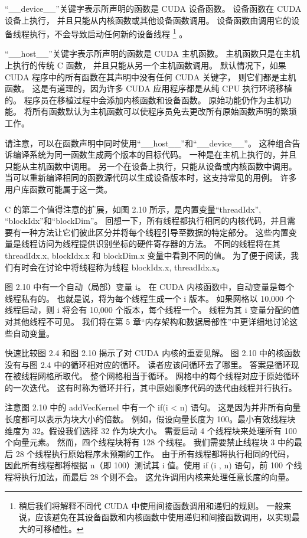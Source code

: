 “\_\_device\_\_”关键字表示所声明的函数是 CUDA 设备函数。 设备函数在 CUDA 设备上执行，
并且只能从内核函数或其他设备函数调用。 设备函数由调用它的设备线程执行，不会导致启动任何新的设备线程
\footnote{稍后我们将解释不同代 CUDA 中使用间接函数调用和递归的规则。 
一般来说，应该避免在其设备函数和内核函数中使用递归和间接函数调用，以实现最大的可移植性。} 。

“\_\_host\_\_”关键字表示所声明的函数是 CUDA 主机函数。 主机函数只是在主机上执行的传统 C 函数，
并且只能从另一个主机函数调用。 默认情况下，如果 CUDA 程序中的所有函数在其声明中没有任何 CUDA 关键字，
则它们都是主机函数。 这是有道理的，因为许多 CUDA 应用程序都是从纯 CPU 执行环境移植的。 
程序员在移植过程中会添加内核函数和设备函数。 原始功能仍作为主机功能。 
将所有函数默认为主机函数可以使程序员免去更改所有原始函数声明的繁琐工作。

请注意，可以在函数声明中同时使用“\_\_host\_\_”和“\_\_device\_\_”。 
这种组合告诉编译系统为同一函数生成两个版本的目标代码。 一种是在主机上执行的，并且只能从主机函数中调用。 
另一个在设备上执行，只能从设备或内核函数中调用。 当可以重新编译相同的函数源代码以生成设备版本时，这支持常见的用例。 
许多用户库函数可能属于这一类。

C 的第二个值得注意的扩展，如图 2.10 所示，是内置变量“threadIdx”, “blockIdx”和“blockDim”。 
回想一下，所有线程都执行相同的内核代码，并且需要有一种方法让它们彼此区分并将每个线程引导至数据的特定部分。 
这些内置变量是线程访问为线程提供识别坐标的硬件寄存器的方法。 
不同的线程将在其 threadIdx.x, blockIdx.x 和 blockDim.x 变量中看到不同的值。 
为了便于阅读，我们有时会在讨论中将线程称为线程 blockIdx.x, threadIdx.x。

图 2.10 中有一个自动（局部）变量 i。 在 CUDA 内核函数中，自动变量是每个线程私有的。 
也就是说，将为每个线程生成一个 i 版本。 如果网格以 10,000 个线程启动，则 i 将会有 10,000 个版本，每个线程一个。 
线程为其 i 变量分配的值对其他线程不可见。 我们将在第 5 章“内存架构和数据局部性”中更详细地讨论这些自动变量。

快速比较图 2.4 和图 2.10 揭示了对 CUDA 内核的重要见解。 图 2.10 中的核函数没有与图 2.4 中的循环相对应的循环。 
读者应该问循环去了哪里。 答案是循环现在被线程网格所取代。 整个网格相当于循环。 网格中的每个线程对应于原始循环的一次迭代。 
这有时称为循环并行，其中原始顺序代码的迭代由线程并行执行。

注意图 2.10 中的 addVecKernel 中有一个 if(i < n) 语句。 这是因为并非所有向量长度都可以表示为块大小的倍数。 
例如，假设向量长度为 100。最小有效线程块维度为 32。假设我们选择 32 作为块大小。 
需要启动 4 个线程块来处理所有 100 个向量元素。 然而，四个线程块将有 128 个线程。 
我们需要禁止线程块 3 中的最后 28 个线程执行原始程序未预期的工作。 由于所有线程都将执行相同的代码，
因此所有线程都将根据 n（即 100）测试其 i 值。使用 if (i , n) 语句，前 100 个线程将执行加法，而最后 28 个则不会。 
这允许调用内核来处理任意长度的向量。

